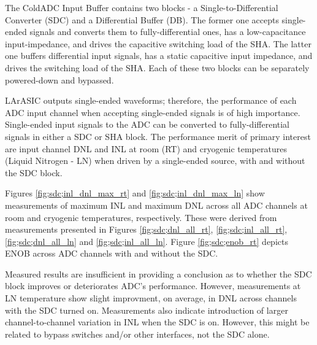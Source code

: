 \label{sec:5.5}



The ColdADC Input Buffer contains two blocks - a Single-to-Differential Converter (SDC) and a Differential Buffer (DB). The former one accepts single-ended signals and converts them to fully-differential ones, has a low-capacitance input-impedance, and drives the capacitive switching load of the SHA. The latter one buffers differential input signals, has a static capacitive input impedance, and drives the switching load of the SHA. Each of these two blocks can be separately powered-down and bypassed.

LArASIC outputs single-ended waveforms; therefore, the performance of each ADC input channel when accepting single-ended signals is of high importance. Single-ended input signals to the ADC can be converted to fully-differential signals in either a SDC or SHA block. The performance merit of primary interest are input channel DNL and INL at room (RT) and cryogenic temperatures (Liquid Nitrogen - LN) when driven by a single-ended source, with and without the SDC block.

Figures \ref{fig;sdc;inl_dnl_max_rt} and \ref{fig;sdc;inl_dnl_max_ln} show measurements of maximum INL and maximum DNL across all ADC channels at room and cryogenic temperatures, respectively. These were derived from measurements presented in Figures \ref{fig;sdc;dnl_all_rt}, \ref{fig;sdc;inl_all_rt}, \ref{fig;sdc;dnl_all_ln} and \ref{fig;sdc;inl_all_ln}. Figure \ref{fig;sdc;enob_rt} depicts ENOB across ADC channels with and without the SDC.

Measured results are insufficient in providing a conclusion as to whether the SDC block improves or deteriorates ADC's performance. However, measurements at LN temperature show slight improvment, on average, in DNL across channels with the SDC turned on. Measurements also indicate introduction of larger channel-to-channel variation in INL when the SDC is on. However, this might be related to bypass switches and/or other interfaces, not the SDC alone.

